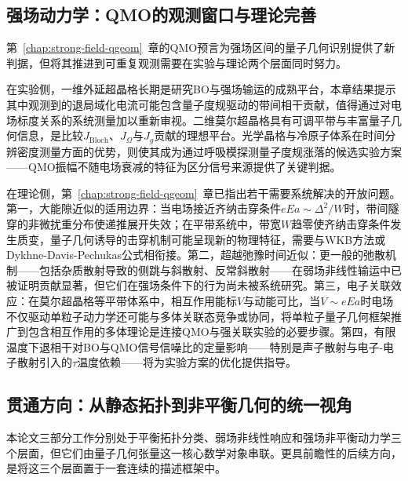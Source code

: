 \subsection{强场动力学：QMO的观测窗口与理论完善}

第~\ref{chap:strong-field-qgeom}~章的QMO预言为强场区间的量子几何识别提供了新判据，但将其推进到可重复观测需要在实验与理论两个层面同时努力。

在实验侧，一维外延超晶格长期是研究BO与强场输运的成熟平台\cite{LEO1992943,PhysRevLett.64.3167}，本章结果提示其中观测到的退局域化电流可能包含量子度规驱动的带间相干贡献，值得通过对电场标度关系的系统测量加以重新审视。二维莫尔超晶格具有可调平带与丰富量子几何信息\cite{lau2022reproducibility,Bloch_in_Moire,Quantum_Geometric_Oscillations}，是比较$J_{\text{Bloch}}$、$J_{\Omega}$与$J_g$贡献的理想平台。光学晶格与冷原子体系在时间分辨密度测量方面的优势\cite{PhysRevLett.87.140402,PhysRevLett.76.4508}，则使其成为通过呼吸模探测量子度规涨落的候选实验方案——QMO振幅不随电场衰减的特征为区分信号来源提供了关键判据。

在理论侧，第~\ref{chap:strong-field-qgeom}~章已指出若干需要系统解决的开放问题。第一，大能隙近似的适用边界：当电场接近齐纳击穿条件$eEa \sim \Delta^2/W$时，带间隧穿的非微扰重分布使递推展开失效；在平带系统中，带宽$W$趋零使齐纳击穿条件发生质变，量子几何诱导的击穿机制可能呈现新的物理特征，需要与WKB方法或Dykhne-Davis-Pechukas公式相衔接\cite{Kitamura2019NonreciprocalLT,L-Z_Green_RPB_2020}。第二，超越弛豫时间近似：更一般的弛散机制——包括杂质散射导致的侧跳与斜散射\cite{Du2021NonlinearHE}、反常斜散射\cite{PhysRevLett.131.076601}——在弱场非线性输运中已被证明贡献显著，但它们在强场条件下的行为尚未被系统研究。第三，电子关联效应：在莫尔超晶格等平带体系中，相互作用能标$V$与动能可比\cite{cao2018unconventional,cao2018correlated,cai2023signatures}，当$V \sim eEa$时电场不仅驱动单粒子动力学还可能与多体关联态竞争或协同，将单粒子量子几何框架推广到包含相互作用的多体理论是连接QMO与强关联实验的必要步骤。第四，有限温度下退相干对BO与QMO信号信噪比的定量影响——特别是声子散射与电子-电子散射引入的$\tau$温度依赖——将为实验方案的优化提供指导。

\subsection{贯通方向：从静态拓扑到非平衡几何的统一视角}

本论文三部分工作分别处于平衡拓扑分类、弱场非线性响应和强场非平衡动力学三个层面，但它们由量子几何张量这一核心数学对象串联。更具前瞻性的后续方向，是将这三个层面置于一套连续的描述框架中。

